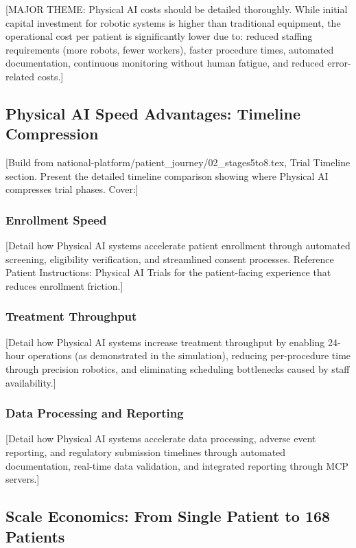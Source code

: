 [MAJOR THEME: Physical AI costs should be detailed thoroughly. While initial
capital investment for robotic systems is higher than traditional equipment,
the operational cost per patient is significantly lower due to: reduced
staffing requirements (more robots, fewer workers), faster procedure times,
automated documentation, continuous monitoring without human fatigue, and
reduced error-related costs.]

\subsection{Physical AI Speed Advantages: Timeline Compression}
\label{subsec:financial-speed}

[Build from national-platform/patient\_journey/02\_stages5to8.tex, Trial
Timeline section. Present the detailed timeline comparison showing where
Physical AI compresses trial phases. Cover:]

\subsubsection{Enrollment Speed}
[Detail how Physical AI systems accelerate patient enrollment through automated
screening, eligibility verification, and streamlined consent processes.
Reference Patient Instructions: Physical AI Trials
\cite{patient-instructions-paper} for the patient-facing experience that
reduces enrollment friction.]

\subsubsection{Treatment Throughput}
[Detail how Physical AI systems increase treatment throughput by enabling
24-hour operations (as demonstrated in the simulation), reducing per-procedure
time through precision robotics, and eliminating scheduling bottlenecks caused
by staff availability.]

\subsubsection{Data Processing and Reporting}
[Detail how Physical AI systems accelerate data processing, adverse event
reporting, and regulatory submission timelines through automated
documentation, real-time data validation, and integrated reporting through
MCP servers.]

\subsection{Scale Economics: From Single Patient to 168 Patients}
\label{subsec:financial-scale}

